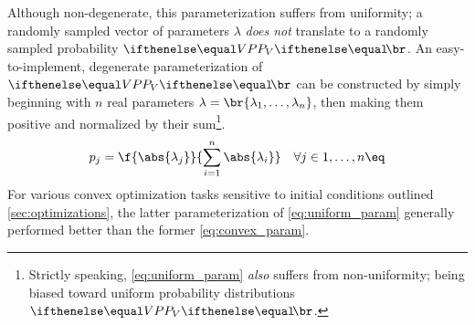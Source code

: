 \documentclass[aps, 10pt, english, twoside, pra, nofootinbib, longbibliography]{revtex4-1}
\theoremstyle{plain}
\theoremstyle{definition}
\theoremstyle{remark}
\begin{document}
    Although non-degenerate, this parameterization suffers from uniformity; a randomly sampled vector of parameters $\lambda$ \textit{does not} translate to a randomly sampled probability $\prob[V]$. An easy-to-implement, degenerate parameterization of $\prob[V]$ can be constructed by simply beginning with $n$ real parameters $\lambda = \br{\lambda_1, \ldots, \lambda_n}$, then making them positive and normalized by their sum\footnote{Strictly speaking, \cref{eq:uniform_param} \textit{also} suffers from non-uniformity; being biased toward uniform probability distributions $\prob[V]$. }.
    \[ p_j = \f{\abs{\lambda_j}}{\sum_{i=1}^{n} \abs{\lambda_i}} \quad \forall j \in 1, \ldots, n \eq \label{eq:uniform_param} \]
    For various convex optimization tasks sensitive to initial conditions outlined \cref{sec:optimizations}, the latter parameterization of \cref{eq:uniform_param} generally performed better than the former \cref{eq:convex_param}.

    
\end{document}
